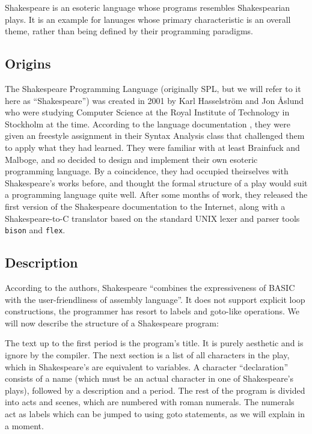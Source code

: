 Shakespeare is an esoteric language whose programs resembles Shakespearian plays. It is an example for lanuages whose primary characteristic is an overall theme, rather than being defined by their programming paradigms.

\subsection{Origins}

The Shakespeare Programming Language (originally SPL, but we will refer to it here as “Shakespeare”) was created in 2001 by Karl Hasselström and Jon Åslund who were studying Computer Science at the Royal Institute of Technology in Stockholm at the time. According to the language documentation \cite{hasselstrom2001shakespeare}, they were given an freestyle assignment in their Syntax Analysis class that challenged them to apply what they had learned. They were familiar with at least Brainfuck and Malboge, and so decided to design and implement their own esoteric programming language. By a coincidence, they had occupied theirselves with Shakespeare's works before, and thought the formal structure of a play would suit a programming language quite well. After some months of work, they released the first version of the Shakespeare documentation to the Internet, along with a Shakespeare-to-C translator based on the standard UNIX lexer and parser tools \texttt{bison} and \texttt{flex}.

\subsection{Description}

According to the authors, Shakespeare “combines the expressiveness of BASIC with the user-friendliness of assembly language”. It does not support explicit loop constructions, the programmer has resort to labels and goto-like operations. We will now describe the structure of a Shakespeare program:

The text up to the first period is the program's title. It is purely aesthetic and is ignore by the compiler. The next section is a list of all characters in the play, which in Shakespeare's are equivalent to variables. A character “declaration” consists of a name (which must be an actual character in one of Shakespeare's plays), followed by a description and a period. The rest of the program is divided into acts and scenes, which are numbered with roman numerals. The numerals act as labels which can be jumped to using goto statements, as we will explain in a moment.

